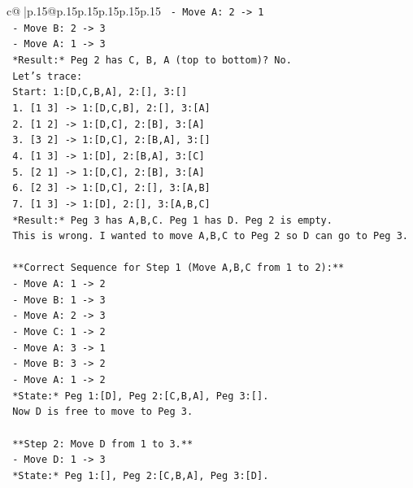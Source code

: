 \documentclass{article}
\begin{document}
{\begin{supertabular}{c@{$\;$}|p{.15\linewidth}@{}p{.15\linewidth}p{.15\linewidth}p{.15\linewidth}p{.15\linewidth}p{.15\linewidth}}
{{{\texttt{     {-} Move A: 2 {-}> 1} \\
\texttt{     {-} Move B: 2 {-}> 3} \\
\texttt{     {-} Move A: 1 {-}> 3} \\
\texttt{     *Result:* Peg 2 has C, B, A (top to bottom)? No.} \\
\texttt{     Let's trace:} \\
\texttt{     Start: 1:{[}D,C,B,A{]}, 2:{[}{]}, 3:{[}{]}} \\
\texttt{     1. {[}1 3{]} {-}> 1:{[}D,C,B{]}, 2:{[}{]}, 3:{[}A{]}} \\
\texttt{     2. {[}1 2{]} {-}> 1:{[}D,C{]}, 2:{[}B{]}, 3:{[}A{]}} \\
\texttt{     3. {[}3 2{]} {-}> 1:{[}D,C{]}, 2:{[}B,A{]}, 3:{[}{]}} \\
\texttt{     4. {[}1 3{]} {-}> 1:{[}D{]}, 2:{[}B,A{]}, 3:{[}C{]}} \\
\texttt{     5. {[}2 1{]} {-}> 1:{[}D,C{]}, 2:{[}B{]}, 3:{[}A{]}} \\
\texttt{     6. {[}2 3{]} {-}> 1:{[}D,C{]}, 2:{[}{]}, 3:{[}A,B{]}} \\
\texttt{     7. {[}1 3{]} {-}> 1:{[}D{]}, 2:{[}{]}, 3:{[}A,B,C{]}} \\
\texttt{     *Result:* Peg 3 has A,B,C. Peg 1 has D. Peg 2 is empty.} \\
\texttt{     This is wrong. I wanted to move A,B,C to Peg 2 so D can go to Peg 3.} \\
\\ 
\texttt{  **Correct Sequence for Step 1 (Move A,B,C from 1 to 2):**} \\
\texttt{  {-} Move A: 1 {-}> 2} \\
\texttt{  {-} Move B: 1 {-}> 3} \\
\texttt{  {-} Move A: 2 {-}> 3} \\
\texttt{  {-} Move C: 1 {-}> 2} \\
\texttt{  {-} Move A: 3 {-}> 1} \\
\texttt{  {-} Move B: 3 {-}> 2} \\
\texttt{  {-} Move A: 1 {-}> 2} \\
\texttt{  *State:* Peg 1:{[}D{]}, Peg 2:{[}C,B,A{]}, Peg 3:{[}{]}.} \\
\texttt{  Now D is free to move to Peg 3.} \\
\\ 
\texttt{  **Step 2: Move D from 1 to 3.**} \\
\texttt{  {-} Move D: 1 {-}> 3} \\
\texttt{  *State:* Peg 1:{[}{]}, Peg 2:{[}C,B,A{]}, Peg 3:{[}D{]}.} \\
}}}
\end{supertabular}}
\end{document}
